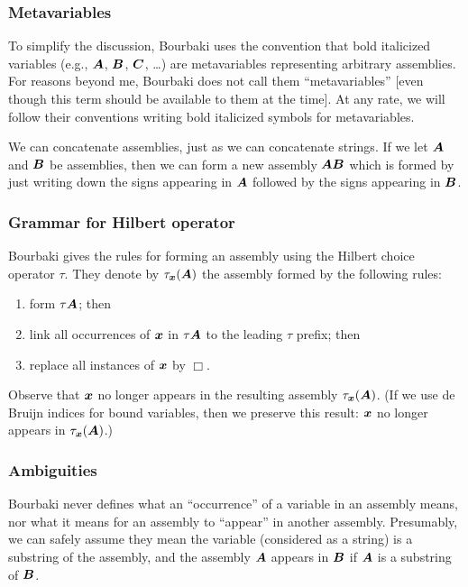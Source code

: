 \subsubsection{Metavariables}
To simplify the discussion, Bourbaki uses the convention that bold
italicized variables (e.g., $\boldsymbol{A}$, $\boldsymbol{B}$,
$\boldsymbol{C}$, \dots) are metavariables representing arbitrary
assemblies. For reasons beyond me, Bourbaki does not call them
``metavariables'' [even though this term should be available to them at
the time]. At any rate, we will follow their conventions writing bold
italicized symbols for metavariables.

\begin{example}
We can concatenate assemblies, just as we can concatenate strings.
If we let $\boldsymbol{A}$ and $\boldsymbol{B}$ be assemblies,
then we can form a new assembly $\boldsymbol{A}\boldsymbol{B}$
which is formed by just writing down the signs appearing in
$\boldsymbol{A}$ followed by the signs appearing in $\boldsymbol{B}$.
\end{example}

\subsubsection{Grammar for Hilbert operator}
Bourbaki gives the rules for forming an assembly using the Hilbert
choice operator $\tau$. They denote by $\tau_{\boldsymbol{x}}(\boldsymbol{A})$
the assembly formed by the following rules:
\begin{enumerate}
\item form $\tau\boldsymbol{A}$; then
\item link all occurrences of $\boldsymbol{x}$ in $\tau\boldsymbol{A}$
  to the leading $\tau$ prefix; then
\item replace all instances of $\boldsymbol{x}$ by $\Box$.
\end{enumerate}
Observe that $\boldsymbol{x}$ no longer appears in the resulting
assembly $\tau_{\boldsymbol{x}}(\boldsymbol{A})$. (If we use de
Bruijn indices for bound variables, then we preserve this result:
$\boldsymbol{x}$ no longer appears in $\tau_{\boldsymbol{x}}(\boldsymbol{A})$.)

\subsubsection{Ambiguities}\label{sec:1-1:ambiguity}
Bourbaki never defines what an ``occurrence'' of a variable in an
assembly means, nor what it means for an assembly to ``appear'' in
another assembly. Presumably, we can safely assume they mean the
variable (considered as a string) is a substring of the assembly, and
the assembly $\boldsymbol{A}$ appears in $\boldsymbol{B}$ if
$\boldsymbol{A}$ is a substring of $\boldsymbol{B}$.

